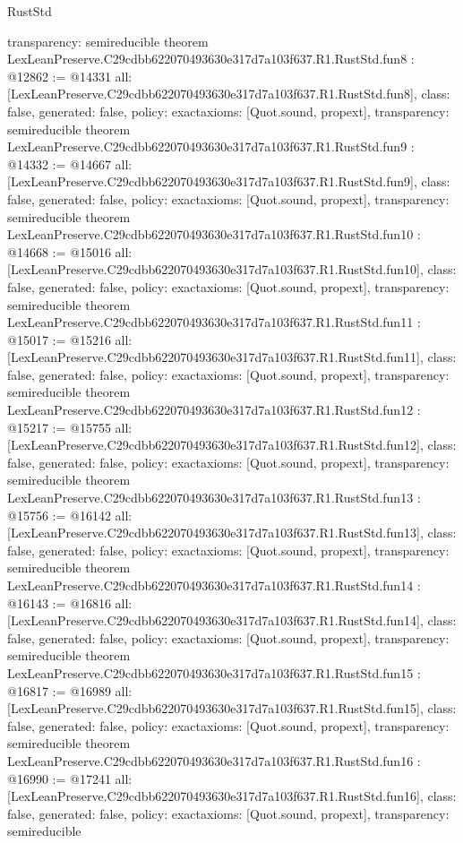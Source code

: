 \begin{lexlean}{RustStd}
\begin{coremodule}
{  transparency: semireducible
}
theorem LexLeanPreserve.C29cdbb622070493630e317d7a103f637.R1.RustStd.fun8 : @12862 := @14331 {
  all: [LexLeanPreserve.C29cdbb622070493630e317d7a103f637.R1.RustStd.fun8],
  class: false,
  generated: false,
  policy: exact{axioms: [Quot.sound, propext]},
  transparency: semireducible
}
theorem LexLeanPreserve.C29cdbb622070493630e317d7a103f637.R1.RustStd.fun9 : @14332 := @14667 {
  all: [LexLeanPreserve.C29cdbb622070493630e317d7a103f637.R1.RustStd.fun9],
  class: false,
  generated: false,
  policy: exact{axioms: [Quot.sound, propext]},
  transparency: semireducible
}
theorem LexLeanPreserve.C29cdbb622070493630e317d7a103f637.R1.RustStd.fun10 : @14668 := @15016 {
  all: [LexLeanPreserve.C29cdbb622070493630e317d7a103f637.R1.RustStd.fun10],
  class: false,
  generated: false,
  policy: exact{axioms: [Quot.sound, propext]},
  transparency: semireducible
}
theorem LexLeanPreserve.C29cdbb622070493630e317d7a103f637.R1.RustStd.fun11 : @15017 := @15216 {
  all: [LexLeanPreserve.C29cdbb622070493630e317d7a103f637.R1.RustStd.fun11],
  class: false,
  generated: false,
  policy: exact{axioms: [Quot.sound, propext]},
  transparency: semireducible
}
theorem LexLeanPreserve.C29cdbb622070493630e317d7a103f637.R1.RustStd.fun12 : @15217 := @15755 {
  all: [LexLeanPreserve.C29cdbb622070493630e317d7a103f637.R1.RustStd.fun12],
  class: false,
  generated: false,
  policy: exact{axioms: [Quot.sound, propext]},
  transparency: semireducible
}
theorem LexLeanPreserve.C29cdbb622070493630e317d7a103f637.R1.RustStd.fun13 : @15756 := @16142 {
  all: [LexLeanPreserve.C29cdbb622070493630e317d7a103f637.R1.RustStd.fun13],
  class: false,
  generated: false,
  policy: exact{axioms: [Quot.sound, propext]},
  transparency: semireducible
}
theorem LexLeanPreserve.C29cdbb622070493630e317d7a103f637.R1.RustStd.fun14 : @16143 := @16816 {
  all: [LexLeanPreserve.C29cdbb622070493630e317d7a103f637.R1.RustStd.fun14],
  class: false,
  generated: false,
  policy: exact{axioms: [Quot.sound, propext]},
  transparency: semireducible
}
theorem LexLeanPreserve.C29cdbb622070493630e317d7a103f637.R1.RustStd.fun15 : @16817 := @16989 {
  all: [LexLeanPreserve.C29cdbb622070493630e317d7a103f637.R1.RustStd.fun15],
  class: false,
  generated: false,
  policy: exact{axioms: [Quot.sound, propext]},
  transparency: semireducible
}
theorem LexLeanPreserve.C29cdbb622070493630e317d7a103f637.R1.RustStd.fun16 : @16990 := @17241 {
  all: [LexLeanPreserve.C29cdbb622070493630e317d7a103f637.R1.RustStd.fun16],
  class: false,
  generated: false,
  policy: exact{axioms: [Quot.sound, propext]},
  transparency: semireducible
}
\end{coremodule}
\end{lexlean}
